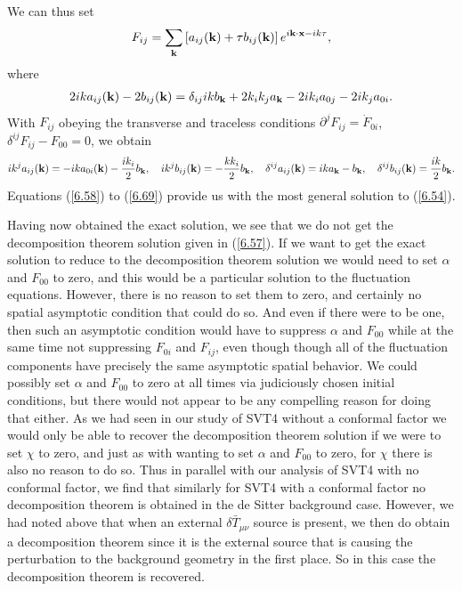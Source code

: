 \documentclass[aps,onecolumn,10pt]{revtex4}
\numberwithin{equation}{section}
\numberwithin{equation}{section}
\begin{document}
%
We can thus set 
%
\begin{eqnarray}
F_{ij}=\sum_{\bf k}\left[a_{ij}({\bf k})+\tau b_{ij}({\bf k})\right]e^{i{\bf k}\cdot {\bf x}-ik\tau},
\label{6.67}
\end{eqnarray}
%
where 
%
\begin{eqnarray}
2ika_{ij}({\bf k})-2b_{ij}({\bf k})=\delta_{ij}ikb_{\bf k}+2k_ik_ja_{\bf k}-2ik_ia_{0j}-2ik_ja_{0i}.
\label{6.68}
\end{eqnarray}
%
With $F_{ij}$ obeying the transverse and traceless conditions $\partial^{j}F_{ij}=\dot{F}_{0i}$, $\delta^{ij}F_{ij}-F_{00}=0$, we obtain 
%
\begin{eqnarray}
ik^ja_{ij}({\bf k})=-ika_{0i}({\bf k})-\frac{ik_i}{2}b_{\bf k},\quad ik^jb_{ij}({\bf k})=-\frac{kk_i}{2}b_{\bf k}, \quad
\delta^{ij}a_{ij}({\bf k})=ika_{\bf k}-b_{\bf k},
\quad \delta^{ij}b_{ij}({\bf k})=\frac{ik}{2}b_{\bf k}.
\label{6.69}
\end{eqnarray}
%
Equations (\ref{6.58}) to (\ref{6.69}) provide us with the most general solution to (\ref{6.54}).


Having now obtained the exact solution, we see that  we do not get the decomposition theorem solution given in (\ref{6.57}). If we want to get the exact solution to reduce to the decomposition theorem solution we would need to set $\alpha$ and $F_{00}$ to zero, and this would be a particular solution to the fluctuation equations. However, there is no reason to set them to zero, and certainly no spatial asymptotic condition that could do so. And even if there were to be one, then such an asymptotic condition would have to suppress $\alpha$ and $F_{00}$ while at the same time not suppressing $F_{0i}$ and $F_{ij}$, even though though all of the fluctuation components have precisely the same asymptotic spatial behavior. We could possibly set $\alpha$ and $F_{00}$ to zero at all times via judiciously chosen initial conditions, but there would not appear to be any compelling reason for doing that either. As we had seen in our study of SVT4 without a conformal factor we would only be able to recover the decomposition theorem solution if we were to set $\chi$ to zero, and just as with wanting to set $\alpha$ and $F_{00}$ to zero, for $\chi$ there is also no reason  to do so. Thus in parallel with our analysis of SVT4 with no conformal factor, we find that similarly for SVT4 with a conformal factor no decomposition theorem is obtained in the de Sitter background case. However, we had noted above that when an external $\delta\bar{T}_{\mu\nu}$ source is present, we then do obtain a decomposition theorem since it is the external source that is causing the perturbation to the background geometry in the first place. So in this case the decomposition theorem is recovered.
\end{document}
